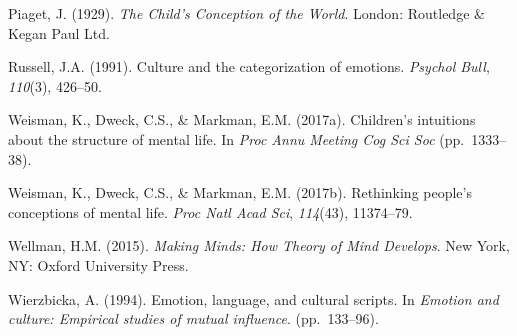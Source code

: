 \documentclass[10pt, letterpaper]{article}
\begin{document}
Piaget, J. (1929). \emph{The Child's Conception of the World}. London:
Routledge \& Kegan Paul Ltd.

Russell, J.A. (1991). Culture and the categorization of emotions.
\emph{Psychol Bull}, \emph{110}(3), 426--50.

Weisman, K., Dweck, C.S., \& Markman, E.M. (2017a). Children's
intuitions about the structure of mental life. In \emph{Proc Annu
Meeting Cog Sci Soc} (pp.~1333--38).

Weisman, K., Dweck, C.S., \& Markman, E.M. (2017b). Rethinking people's
conceptions of mental life. \emph{Proc Natl Acad Sci}, \emph{114}(43),
11374--79.

Wellman, H.M. (2015). \emph{Making Minds: How Theory of Mind Develops}.
New York, NY: Oxford University Press.

Wierzbicka, A. (1994). Emotion, language, and cultural scripts. In
\emph{Emotion and culture: Empirical studies of mutual influence}.
(pp.~133--96).

\setlength{\parindent}{-0.1in} \setlength{\leftskip}{0.125in} \noindent
\end{document}
